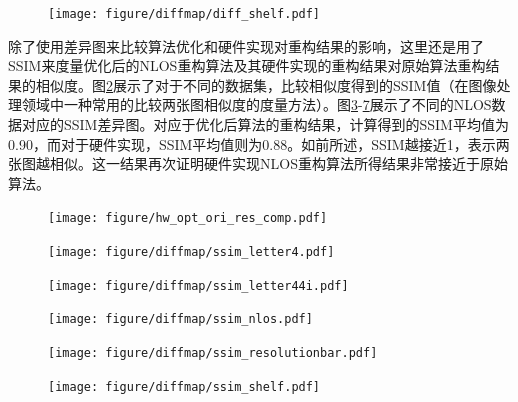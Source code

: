 \documentclass[master]{shtthesis}             %
\begin{document}
\begin{figure}[!tb]
  \centering
  \texttt{[image: figure/diffmap/diff\_shelf.pdf]}
  \label{fig:diff_shelf}
\end{figure}

除了使用差异图来比较算法优化和硬件实现对重构结果的影响，这里还是用了SSIM来度量优化后的NLOS重构算法及其硬件实现的重构结果对原始算法重构结果的相似度。图\ref{fig:ssim}展示了对于不同的数据集，比较相似度得到的SSIM值（在图像处理领域中一种常用的比较两张图相似度的度量方法）。图\ref{fig:ssim_l4}-\ref{fig:ssim_shelf}展示了不同的NLOS数据对应的SSIM差异图。对应于优化后算法的重构结果，计算得到的SSIM平均值为0.90，而对于硬件实现，SSIM平均值则为0.88。如前所述，SSIM越接近1，表示两张图越相似。这一结果再次证明硬件实现NLOS重构算法所得结果非常接近于原始算法。
\begin{figure}[!tb]
    \centering
    \texttt{[image: figure/hw\_opt\_ori\_res\_comp.pdf]}
    \label{fig:ssim}
\end{figure}

\begin{figure}[!tb]
  \centering
  \texttt{[image: figure/diffmap/ssim\_letter4.pdf]}
  \label{fig:ssim_l4}
\end{figure}

\begin{figure}[!tb]
  \centering
  \texttt{[image: figure/diffmap/ssim\_letter44i.pdf]}
  \label{fig:ssim_l44i}
\end{figure}

\begin{figure}[!tb]
  \centering
  \texttt{[image: figure/diffmap/ssim\_nlos.pdf]}
  \label{fig:ssim_nlos}
\end{figure}

\begin{figure}[!tb]
  \centering
  \texttt{[image: figure/diffmap/ssim\_resolutionbar.pdf]}
  \label{fig:ssim_resolutionbar}
\end{figure}

\begin{figure}[!tb]
  \centering
  \texttt{[image: figure/diffmap/ssim\_shelf.pdf]}
  \label{fig:ssim_shelf}
\end{figure}
\end{document}
